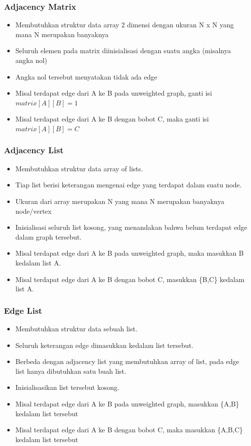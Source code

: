 \begin{frame}
\frametitle{Adjacency Matrix}

\begin{itemize}
  \item Membutuhkan struktur data array 2 dimensi dengan ukuran N x N yang mana N merupakan banyaknya 
  \item Seluruh elemen pada matrix diinisialisasi dengan suatu angka (misalnya angka nol)
  \item Angka nol tersebut menyatakan tidak ada edge
  \item Misal terdapat edge dari A ke B pada unweighted graph, ganti isi $matrix[A][B] = 1$
  \item Misal terdapat edge dari A ke B dengan bobot C, maka ganti isi $matrix[A][B] = C$
\end{itemize}

\end{frame}

\begin{frame}
\frametitle{Adjacency List}
\begin{itemize}
  \item Membutuhkan struktur data array of lists.
  \item Tiap list berisi keterangan mengenai edge yang terdapat dalam suatu node.
  \item Ukuran dari array merupakan N yang mana N merupakan banyaknya node/vertex
  \item Inisialisasi seluruh list kosong, yang menandakan bahwa belum terdapat edge dalam graph tersebut.
  \item Misal terdapat edge dari A ke B pada unweighted graph, maka masukkan B kedalam list A.
  \item Misal terdapat edge dari A ke B dengan bobot C, masukkan \{B,C\} kedalam list A.
\end{itemize}
\end{frame}

\begin{frame}
\frametitle{Edge List}

\begin{itemize}
  \item Membutuhkan struktur data sebuah list.
  \item Seluruh keterangan edge dimasukkan kedalam list tersebut.
  \item Berbeda dengan adjacency list yang membutuhkan array of list, pada edge list hanya dibutuhkan satu buah list.
  \item Inisialisasikan list tersebut kosong.
  \item Misal terdapat edge dari A ke B pada unweighted graph, masukkan \{A,B\} kedalam list tersebut
  \item Misal terdapat edge dari A ke B dengan bobot C, maka masukkan \{A,B,C\} kedalam list tersebut
\end{itemize}

\end{frame}


